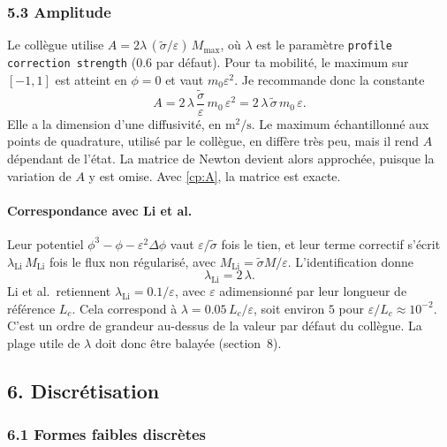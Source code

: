 \subsubsection*{5.3 Amplitude}

Le collègue utilise $A = 2\lambda\,(\tilde{\sigma}/\varepsilon)\,M_{\max}$, où $\lambda$ est le paramètre \texttt{profile correction strength} ($0.6$ par défaut). Pour ta mobilité, le maximum sur $[-1,1]$ est atteint en $\phi=0$ et vaut $m_0\varepsilon^{2}$. Je recommande donc la constante
\begin{equation}\label{cp:A}
  A = 2\,\lambda\,\frac{\tilde{\sigma}}{\varepsilon}\,m_0\,\varepsilon^{2} = 2\,\lambda\,\tilde{\sigma}\,m_0\,\varepsilon .
\end{equation}
Elle a la dimension d'une diffusivité, en $\mathrm{m}^{2}/\mathrm{s}$. Le maximum échantillonné aux points de quadrature, utilisé par le collègue, en diffère très peu, mais il rend $A$ dépendant de l'état. La matrice de Newton devient alors approchée, puisque la variation de $A$ y est omise. Avec \eqref{cp:A}, la matrice est exacte.

\paragraph{Correspondance avec Li et al.} Leur potentiel $\phi^{3}-\phi-\varepsilon^{2}\Delta\phi$ vaut $\varepsilon/\tilde{\sigma}$ fois le tien, et leur terme correctif s'écrit $\lambda_{\mathrm{Li}}\,M_{\mathrm{Li}}$ fois le flux non régularisé, avec $M_{\mathrm{Li}} = \tilde{\sigma}M/\varepsilon$. L'identification donne
\begin{equation}
  \lambda_{\mathrm{Li}} = 2\,\lambda .
\end{equation}
Li et al.\ retiennent $\lambda_{\mathrm{Li}} = 0.1/\varepsilon$, avec $\varepsilon$ adimensionné par leur longueur de référence $L_c$. Cela correspond à $\lambda = 0.05\,L_c/\varepsilon$, soit environ $5$ pour $\varepsilon/L_c\approx10^{-2}$. C'est un ordre de grandeur au-dessus de la valeur par défaut du collègue. La plage utile de $\lambda$ doit donc être balayée (section~8).

\subsection*{6. Discrétisation}

\subsubsection*{6.1 Formes faibles discrètes}

